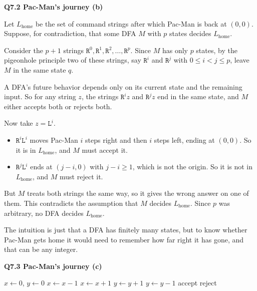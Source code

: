 \documentclass[11pt]{article}
\newcommand{\set}[1]{\left\{#1\right\}}
\newcommand{\qpage}[1]{\clearpage\noindent\textbf{\large #1}\par\medskip}
\begin{document}
\qpage{Q7.2 Pac-Man's journey (b)}

Let $L_{\text{home}}$ be the set of command strings after which Pac-Man is back at $(0,0)$.
Suppose, for contradiction, that some DFA $M$ with $p$ states decides $L_{\text{home}}$.

Consider the $p+1$ strings $\mathtt{R}^0, \mathtt{R}^1, \mathtt{R}^2, \ldots, \mathtt{R}^{p}$.
Since $M$ has only $p$ states, by the pigeonhole principle two of these strings, say $\mathtt{R}^i$ and $\mathtt{R}^j$ with $0 \le i < j \le p$, leave $M$ in the same state $q$.

A DFA's future behavior depends only on its current state and the remaining input.
So for any string $z$, the strings $\mathtt{R}^i z$ and $\mathtt{R}^j z$ end in the same state, and $M$ either accepts both or rejects both.

Now take $z = \mathtt{L}^i$.
\begin{itemize}
  \item $\mathtt{R}^i \mathtt{L}^i$ moves Pac-Man $i$ steps right and then $i$ steps left, ending at $(0,0)$. So it is in $L_{\text{home}}$, and $M$ must accept it.
  \item $\mathtt{R}^j \mathtt{L}^i$ ends at $(j - i, 0)$ with $j - i \ge 1$, which is not the origin. So it is not in $L_{\text{home}}$, and $M$ must reject it.
\end{itemize}
But $M$ treats both strings the same way, so it gives the wrong answer on one of them.
This contradicts the assumption that $M$ decides $L_{\text{home}}$.
Since $p$ was arbitrary, no DFA decides $L_{\text{home}}$.

The intuition is just that a DFA has finitely many states, but to know whether Pac-Man gets home it would need to remember how far right it has gone, and that can be any integer.

\qpage{Q7.3 Pac-Man's journey (c)}

\begin{algorithmic}[1]
  \Require{A command string $s = s_1 s_2 \cdots s_n$ over $\set{\mathtt{L},\mathtt{R},\mathtt{U},\mathtt{D}}$}
    \State $x \gets 0$, $y \gets 0$
       $x \gets x - 1$
       $x \gets x + 1$
       $y \gets y + 1$
      \Else{} $y \gets y - 1$ 
      \EndIf
    \EndFor
     \Return accept
    \Else{} \Return reject
    \EndIf
  \EndFunction
\end{algorithmic}
\end{document}
